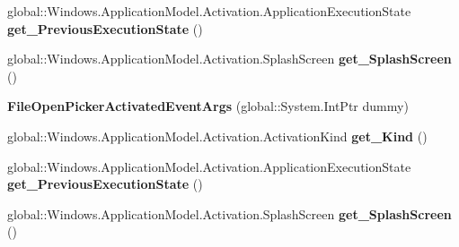 \begin{DoxyCompactItemize}
global\+::\+Windows.\+Application\+Model.\+Activation.\+Application\+Execution\+State {\bfseries get\+\_\+\+Previous\+Execution\+State} ()
\item 
\mbox{\label{class_windows_1_1_application_model_1_1_activation_1_1_file_open_picker_activated_event_args_a3395084a778307a4f086d5f43330d8a9}} 
global\+::\+Windows.\+Application\+Model.\+Activation.\+Splash\+Screen {\bfseries get\+\_\+\+Splash\+Screen} ()
\item 
\mbox{\label{class_windows_1_1_application_model_1_1_activation_1_1_file_open_picker_activated_event_args_ae106dba9758a64d75cd44ac97ab3ff2f}} 
{\bfseries File\+Open\+Picker\+Activated\+Event\+Args} (global\+::\+System.\+Int\+Ptr dummy)
\item 
\mbox{\label{class_windows_1_1_application_model_1_1_activation_1_1_file_open_picker_activated_event_args_a217adc9bb6adcbb1bb9404e13b3d96cf}} 
global\+::\+Windows.\+Application\+Model.\+Activation.\+Activation\+Kind {\bfseries get\+\_\+\+Kind} ()
\item 
\mbox{\label{class_windows_1_1_application_model_1_1_activation_1_1_file_open_picker_activated_event_args_a537d05cdd2bcfaf1f9bf59bf89a23758}} 
global\+::\+Windows.\+Application\+Model.\+Activation.\+Application\+Execution\+State {\bfseries get\+\_\+\+Previous\+Execution\+State} ()
\item 
\mbox{\label{class_windows_1_1_application_model_1_1_activation_1_1_file_open_picker_activated_event_args_a3395084a778307a4f086d5f43330d8a9}} 
global\+::\+Windows.\+Application\+Model.\+Activation.\+Splash\+Screen {\bfseries get\+\_\+\+Splash\+Screen} ()
\item 
\mbox{\label{class_windows_1_1_application_model_1_1_activation_1_1_file_open_picker_activated_event_args_ae106dba9758a64d75cd44ac97ab3ff2f}} 

\end{DoxyCompactItemize}
